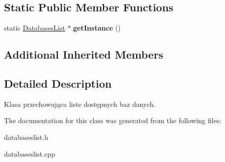 \subsection*{Static Public Member Functions}
\begin{DoxyCompactItemize}
\item 
\mbox{\label{class_databases_list_a2e1bc9475b1b28106fe2d0b32fb0db1a}} 
static \mbox{\hyperlink{class_databases_list}{Databases\+List}} $\ast$ {\bfseries get\+Instance} ()
\end{DoxyCompactItemize}
\subsection*{Additional Inherited Members}


\subsection{Detailed Description}
Klasa przechowująca liste dostępnych baz danych. 

The documentation for this class was generated from the following files\+:\begin{DoxyCompactItemize}
\item 
databaseslist.\+h\item 
databaseslist.\+cpp\end{DoxyCompactItemize}
